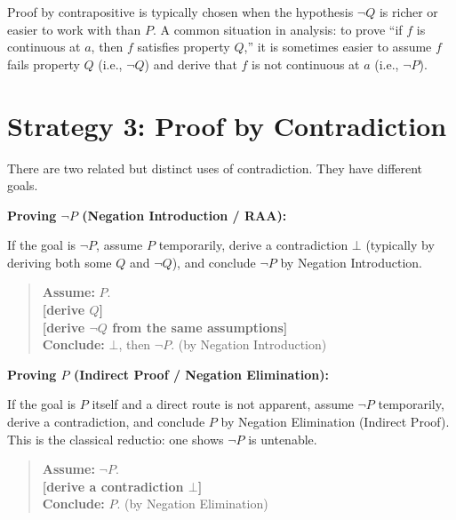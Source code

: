 \begin{remark}
Proof by contrapositive is typically chosen when the hypothesis $\neg Q$ is
richer or easier to work with than $P$. A common situation in analysis: to
prove ``if $f$ is continuous at $a$, then $f$ satisfies property $Q$,'' it is
sometimes easier to assume $f$ fails property $Q$ (i.e., $\neg Q$) and derive
that $f$ is not continuous at $a$ (i.e., $\neg P$).
\end{remark}


\section*{Strategy 3: Proof by Contradiction}

There are two related but distinct uses of contradiction. They have different
goals.

\medskip
\noindent\textbf{Proving $\neg P$ (Negation Introduction / RAA):}

If the goal is $\neg P$, assume $P$ temporarily, derive a contradiction $\bot$
(typically by deriving both some $Q$ and $\neg Q$), and conclude $\neg P$ by
Negation Introduction.

\begin{quote}
\textbf{Assume:} $P$. \\
\textbf{[derive $Q$]} \\
\textbf{[derive $\neg Q$ from the same assumptions]} \\
\textbf{Conclude:} $\bot$, then $\neg P$. \quad (by Negation Introduction)
\end{quote}

\medskip
\noindent\textbf{Proving $P$ (Indirect Proof / Negation Elimination):}

If the goal is $P$ itself and a direct route is not apparent, assume $\neg P$
temporarily, derive a contradiction, and conclude $P$ by Negation Elimination
(Indirect Proof). This is the classical reductio: one shows $\neg P$ is
untenable.

\begin{quote}
\textbf{Assume:} $\neg P$. \\
\textbf{[derive a contradiction $\bot$]} \\
\textbf{Conclude:} $P$. \quad (by Negation Elimination)
\end{quote}


